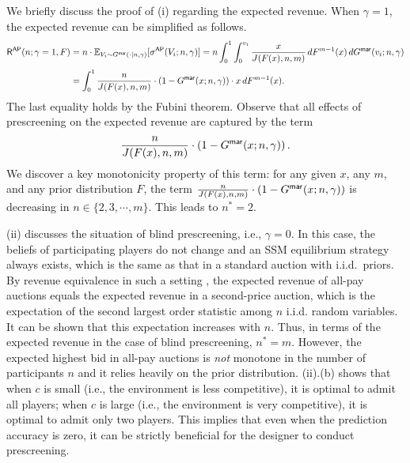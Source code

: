 We briefly discuss the proof of  (i) regarding the expected revenue. When $\gamma=1$, the expected revenue can be simplified as follows.
\begin{align*}
 \mathsf{R}^{\mathsf{AP}}(n;\gamma=1,F) & = n\cdot \mathbb{E}_{V_i\sim G^{\mathsf{mar}}(\cdot\mid n,\gamma)}[\sigma^{\mathsf{AP}}(V_i;n,\gamma)]
 = n\int_0^1 \int_0^{v_i} \frac{x}{J(F(x),n,m)}\, dF^{m-1}(x)\, dG^{\mathsf{mar}}(v_i;n,\gamma)\\[1mm]
 &= \int_0^1 \frac{n}{J(F(x),n,m)} \cdot \left(1-G^{\mathsf{mar}}(x; n,\gamma)\right) \cdot x\, dF^{m-1}(x).
\end{align*}
The last equality holds by the Fubini theorem. Observe that all effects of prescreening on the expected revenue are captured by the term 
\[
\frac{n}{J(F(x),n,m)}\cdot \left(1-G^{\mathsf{mar}}(x;n,\gamma)\right).
\]
We discover a key monotonicity property of this term: for any given $x$, any $m$, and any prior distribution $F$, the term $\frac{n}{J(F(x),n,m)}\cdot \left(1-G^{\mathsf{mar}}(x;n,\gamma)\right)$ is decreasing in $n\in \{2,3,\cdots,m\}$.
This leads to $n^\ast=2$.

 (ii) discusses the situation of blind prescreening, i.e., $\gamma=0$. In this case, the beliefs of participating players do not change and an SSM equilibrium strategy always exists, which is the same as that in a standard auction with i.i.d.\ priors. By revenue equivalence in such a setting \citep{myerson_1981_optimal_auction}, the expected revenue of all-pay auctions equals the expected revenue in a second-price auction, which is the expectation of the second largest order statistic among $n$ i.i.d. random variables. It can be shown that this expectation increases with $n$. 
Thus, in terms of the expected revenue in the case of blind prescreening, $n^\ast=m$.
However, the expected highest bid in all-pay auctions is \textit{not} monotone in the number of participants $n$ and it relies heavily on the prior distribution.  (ii).(b) shows that when $c$ is small (i.e., the environment is less competitive), it is optimal to admit all players; when $c$ is large (i.e., the environment is very competitive), it is optimal to admit only two players. This implies that even when the prediction accuracy is zero, it can be strictly beneficial for the designer to conduct prescreening.



